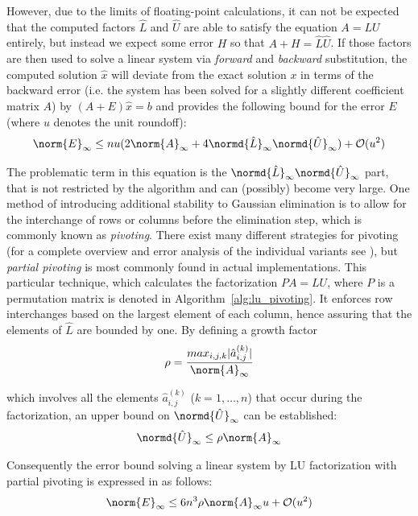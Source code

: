 \noindent However, due to the limits of floating-point calculations, it can not be expected that the computed factors $\hat{L}$ and $\hat{U}$ are able to satisfy the equation $A=LU$ entirely, but instead we expect some error $H$ so that $A + H = \hat{L}\hat{U}$. If those factors are then used to solve a linear system via \textit{forward} and \textit{backward} substitution, the computed solution $\hat{x}$ will deviate from the exact solution $x$ in terms of the backward error (i.e. the system has been solved for a slightly different coefficient matrix $A$) by $(A+E)\hat{x}=b$ and \cite{golub_matrix_2013} provides the following bound for the error $E$ (where $u$ denotes the unit roundoff):
\begin{equation}
    \norm{E}_\infty \leq nu(2\norm{A}_\infty+4\normd{\hat{L}}_\infty\normd{\hat{U}}_\infty) + \mathcal{O}(u^2)
\end{equation}



\noindent The problematic term in this equation is the $\normd{\hat{L}}_\infty\normd{\hat{U}}_\infty$ part, that is not restricted by the algorithm and can (possibly) become very large. One method of introducing additional stability to Gaussian elimination is to allow for the interchange of rows or columns before the elimination step, which is commonly known as \textit{pivoting}. There exist many different strategies for pivoting (for a complete overview and error analysis of the individual variants see \cite{higham_accuracy_2002}), but \textit{partial pivoting} is most commonly found in actual implementations. This particular technique, which calculates the factorization $PA=LU$, where $P$ is a permutation matrix is denoted in Algorithm~\hyperref[alg:lu_pivoting]{\ref{alg:lu_pivoting}}. It enforces row interchanges based on the largest element of each column, hence assuring that the elements of $\hat{L}$ are bounded by one. By defining a growth factor
\begin{equation}
    \rho = \frac{max_{i,j,k}|\hat{a}_{i,j}^{(k)}|}{\norm{A}_\infty}
\end{equation}

\noindent which involves all the elements $\hat{a}_{i,j}^{(k)}$ ($k=1,\dots, n$) that occur during the factorization, an upper bound on $\normd{\hat{U}}_\infty$ can be established:
\begin{equation}
    \normd{\hat{U}}_\infty \leq \rho \norm{A}_\infty
\end{equation}

\noindent Consequently the error bound solving a linear system by LU factorization with partial pivoting is expressed in \cite{golub_matrix_2013} as follows:
\begin{equation}
    \norm{E}_\infty \leq 6n^3\rho\norm{A}_\infty u + \mathcal{O}(u^2)
\end{equation}

